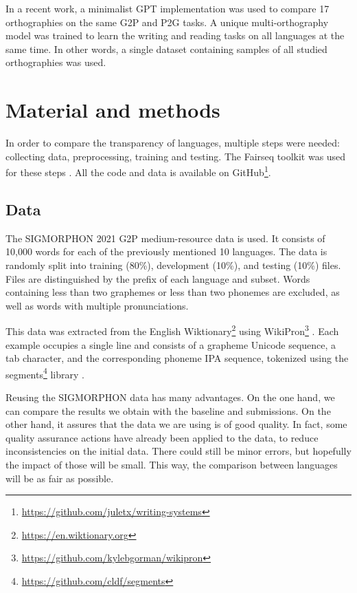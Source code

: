 \documentclass[11pt,a4paper]{article}
\begin{document}
In a recent work, a minimalist GPT implementation was used to compare 17 orthographies \cite{marjou2021oteann} on the same G2P and P2G tasks. A unique multi-orthography model was trained to learn the writing and reading tasks on all languages at the same time. In other words, a single dataset containing samples of all studied orthographies was used.

\section{Material and methods}

In order to compare the transparency of languages, multiple steps were needed: collecting data, preprocessing, training and testing. The Fairseq toolkit was used for these steps \cite{ott2019fairseq}. All the code and data is available on GitHub\footnote{\url{https://github.com/juletx/writing-systems}}.

\subsection{Data}

The SIGMORPHON 2021 G2P medium-resource data is used. It consists of 10,000 words for each of the previously mentioned 10 languages. The data is randomly split into training (80\%), development (10\%), and testing (10\%) files. Files are distinguished by the prefix of each language and subset. Words containing less than two graphemes or less than two phonemes are excluded, as well as words with multiple pronunciations. 

This data was extracted from the English Wiktionary\footnote{\url{https://en.wiktionary.org}} using WikiPron\footnote{\url{https://github.com/kylebgorman/wikipron}} \cite{lee-etal-2020-massively}. Each example occupies a single line and consists of a grapheme Unicode sequence, a tab character, and the corresponding phoneme IPA sequence, tokenized using the segments\footnote{\url{https://github.com/cldf/segments}} library \cite{moran2018unicode}.

Reusing the SIGMORPHON data has many advantages. On the one hand, we can compare the results we obtain with the baseline and submissions. On the other hand, it assures that the data we are using is of good quality. In fact, some quality assurance actions have already been applied to the data, to reduce inconsistencies on the initial data. There could still be minor errors, but hopefully the impact of those will be small. This way, the comparison between languages will be as fair as possible.
\end{document}
